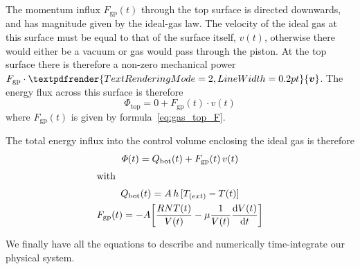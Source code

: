 \documentclass[a4paper,12pt,%
onecolumn,oneside,%
british%
]{memoir}
\renewcommand*{\bm}[1]{\textpdfrender{TextRenderingMode=2,LineWidth=0.2pt}{\boldsymbol{#1}}}
\newcommand*{\di}{\mathrm{d}}%
\renewcommand*{\|}[1][]{\nonscript\:#1\vert\nonscript\:\mathopen{}}
\newcommand*{\yvis}{\mu} %
\newcommand*{\yhea}{h} %
\newcommand*{\yv}{\bm{v}}
\newcommand*{\yN}{N}
\newcommand*{\yH}{\varPhi}%
\newcommand*{\yQb}{Q_{\text{bot}}}%
\newcommand*{\yFgp}{F_{\text{gp}}}
\newcommand*{\ypr}{p} %
\newcommand*{\yT}{T}%
\newcommand*{\yTe}{\yT_{\text(ext)}}%
\begin{document}
\begin{description}
  The momentum influx $\yFgp(t)$ through the top surface is directed downwards, and has magnitude given by the ideal-gas law. The velocity of the ideal gas at this surface must be equal to that of the surface itself, $v(t)$, otherwise there would either be a vacuum or gas would pass through the piston. At the top surface there is therefore a non-zero mechanical power $\yFgp\cdot\yv$. The energy flux across this surface is therefore
  \begin{equation*}
    \yH_{\text{top}} = 0 + \yFgp(t)\cdot v(t)
  \end{equation*}
where $\yFgp(t)$ is given by formula~\eqref{eq:gas_top_F}.
\end{description}

The total energy influx into the control volume enclosing the ideal gas is therefore
\begin{equation}
  \label{eq:gas_energy_influx}
  \begin{gathered}
    \yH(t) = \yQb(t) + \yFgp(t) \,v(t)
    \\[\jot]\text{with}\hfill
    \\[\jot]
    \yQb(t) = A\,\yhea\,[\yTe-\yT(t)]
    \\
    \yFgp(t) = -A\biggl[\frac{R \yN \yT(t)}{V(t)}  -\yvis \frac{1}{V(t)}\frac{\di V(t)}{\di t}\biggr]
  \end{gathered}
\end{equation}

We finally have all the equations to describe and numerically time-integrate our physical system.
\end{document}
